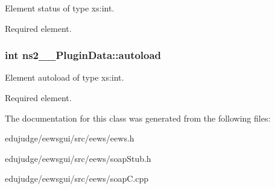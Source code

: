 Element status of type xs:int. 

Required element. 
\subsubsection{\setlength{\rightskip}{0pt plus 5cm}int {\bf ns2\_\-\_\-PluginData::autoload}}\label{classns2____PluginData_60c36b10688e6139d0c00c45dbbabd7a}


Element autoload of type xs:int. 

Required element. 

The documentation for this class was generated from the following files:\begin{CompactItemize}
\item 
edujudge/eewsgui/src/eews/eews.h\item 
edujudge/eewsgui/src/eews/soapStub.h\item 
edujudge/eewsgui/src/eews/soapC.cpp\end{CompactItemize}
